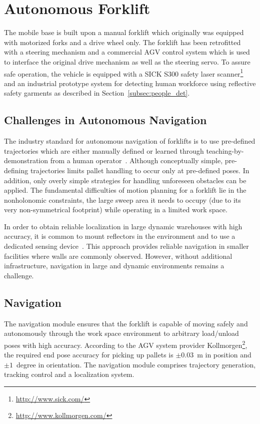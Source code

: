 \section{Autonomous Forklift}
\label{sec:agv}
%
The mobile base is built upon a manual forklift which originally was equipped with motorized forks
and a drive wheel only. The forklift has been retrofitted with a steering mechanism and a commercial
AGV control system which is used to interface the original drive mechanism as well as the steering
servo. To assure safe operation, the vehicle is equipped with a SICK S300 safety laser
scanner\footnote{\url{http://www.sick.com/}} and an industrial prototype system for detecting human
workforce using reflective safety garments as described in Section~\ref{subsec:people_det}.
%
\subsection{Challenges in Autonomous Navigation}
\label{subsec:AGV_challenges}
%
The industry standard for autonomous navigation of forklifts is to use pre-defined trajectories which
are either manually defined or learned through teaching-by-demonstration from a human
operator~\cite{Hell06, Marsh08}. Although conceptually simple, pre-defining trajectories limits
pallet handling to occur only at pre-defined poses. In addition, only overly simple strategies for
handling unforeseen obstacles can be applied. The fundamental difficulties of motion planning for a
forklift lie in the nonholonomic constraints, the large sweep area it needs to occupy (due to its
very non-symmetrical footprint) while operating in a limited work space.

In order to obtain reliable localization in large dynamic warehouses with high accuracy, it is
common to mount reflectors in the environment and to use a dedicated sensing
device~\cite{Hyyp89}. This approach provides reliable navigation in smaller facilities where walls
are commonly observed. However, without additional infrastructure, navigation in large and dynamic
environments remains a challenge.
%
\subsection{Navigation}
\label{subsec:navigation}
%
The navigation module ensures that the forklift is capable of moving safely and autonomously through
the work space environment to arbitrary load/unload poses with high accuracy. According to the AGV
system provider Kollmorgen\footnote{\url{http://www.kollmorgen.com/}}, the required end pose
accuracy for picking up pallets is $\pm0.03$~m in position and $\pm1$~degree in orientation. The
navigation module comprises trajectory generation, tracking control and a localization system.
 
